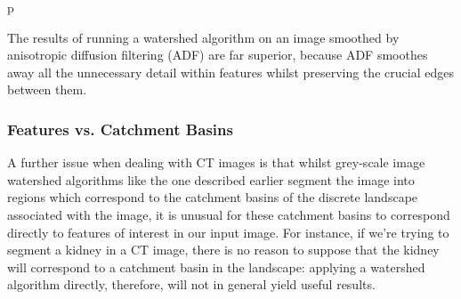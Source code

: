 \begin{stusubfig}{p}
	\\
	\hspace{4mm}%
\caption{The results of running a watershed algorithm on an image smoothed by anisotropic diffusion filtering (ADF) are far superior, because ADF smoothes away all the unnecessary detail within features whilst preserving the crucial edges between them.}
\label{fig:segmentation-watershed-adfexample}
\end{stusubfig}

\subsubsection{Features vs. Catchment Basins}

A further issue when dealing with CT images is that whilst grey-scale image watershed algorithms like the one described earlier segment the image into regions which correspond to the catchment basins of the discrete landscape associated with the image, it is unusual for these catchment basins to correspond directly to features of interest in our input image. For instance, if we're trying to segment a kidney in a CT image, there is no reason to suppose that the kidney will correspond to a catchment basin in the landscape: applying a watershed algorithm directly, therefore, will not in general yield useful results.

